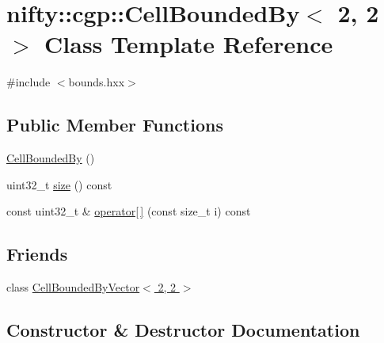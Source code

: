 \hypertarget{classnifty_1_1cgp_1_1CellBoundedBy_3_012_00_012_01_4}{}\section{nifty\+:\+:cgp\+:\+:Cell\+Bounded\+By$<$ 2, 2 $>$ Class Template Reference}
\label{classnifty_1_1cgp_1_1CellBoundedBy_3_012_00_012_01_4}


{\ttfamily \#include $<$bounds.\+hxx$>$}

\subsection*{Public Member Functions}
\begin{DoxyCompactItemize}
\item 
\hyperlink{classnifty_1_1cgp_1_1CellBoundedBy_3_012_00_012_01_4_a1a0bbe867a4d5959bd2dba49c9f61b51}{Cell\+Bounded\+By} ()
\item 
uint32\+\_\+t \hyperlink{classnifty_1_1cgp_1_1CellBoundedBy_3_012_00_012_01_4_acfede2965ebce20b047084af806ceaeb}{size} () const
\item 
const uint32\+\_\+t \& \hyperlink{classnifty_1_1cgp_1_1CellBoundedBy_3_012_00_012_01_4_acde63a1f0ca2b9f0a55b5d71487c7f14}{operator\mbox{[}$\,$\mbox{]}} (const size\+\_\+t i) const
\end{DoxyCompactItemize}
\subsection*{Friends}
\begin{DoxyCompactItemize}
\item 
class \hyperlink{classnifty_1_1cgp_1_1CellBoundedBy_3_012_00_012_01_4_ac693d488f7701019d117083cebc4508b}{Cell\+Bounded\+By\+Vector$<$ 2, 2 $>$}
\end{DoxyCompactItemize}


\subsection{Constructor \& Destructor Documentation}
\mbox{\label{classnifty_1_1cgp_1_1CellBoundedBy_3_012_00_012_01_4_a1a0bbe867a4d5959bd2dba49c9f61b51}} 
